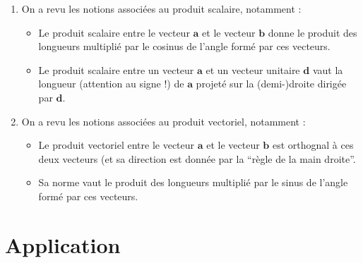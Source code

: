 \documentclass[a4paper,10pt]{tp_um}
\begin{document}
\begin{remark}
    \begin{enumerate}
        \item On a revu les notions associées au produit scalaire, notamment :
            \begin{itemize}
                \item Le produit scalaire entre le vecteur $\mathbf{a}$ et le vecteur $\mathbf{b}$ donne le produit des longueurs multiplié par le cosinus de
                    l’angle formé par ces vecteurs.
                \item Le produit scalaire entre un vecteur $\mathbf{a}$ et un vecteur unitaire $\mathbf{d}$ vaut la longueur (attention au signe !) de $\mathbf{a}$ projeté
                    sur la (demi-)droite dirigée par $\mathbf{d}$.
            \end{itemize}

        \item On a revu les notions associées au produit vectoriel, notamment :
            \begin{itemize}
                \item Le produit vectoriel entre le vecteur $\mathbf{a}$ et le vecteur $\mathbf{b}$ est orthognal à ces deux vecteurs (et sa direction est donnée
                        par la ``règle de la main droite''.
                    \item Sa norme vaut le produit des longueurs multiplié par le sinus de l’angle formé par ces vecteurs.
                \end{itemize}
        \end{enumerate}
    \end{remark}

\section{Application}
\end{document}
